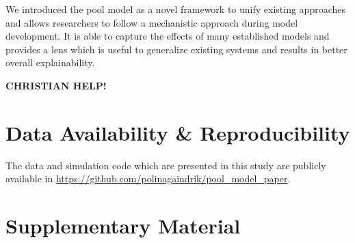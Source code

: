 \documentclass[10pt,A4paper]{article}
\numberwithin{equation}{section}
\newcommand{\beginsupplement}{%
  \renewcommand{\thesection}{}
  \setcounter{subsection}{0}
  \renewcommand{\thesubsection}{S\arabic{subsection}}
  \setcounter{table}{0}
  \renewcommand{\thetable}{S\arabic{table}}%
  \setcounter{figure}{0}
  \renewcommand{\thefigure}{S\arabic{figure}}%
  \setcounter{listing}{0}
  \renewcommand{\thelisting}{S\arabic{listing}}
}
\begin{document}
We introduced the pool model as a novel framework to unify existing approaches and allows researchers to follow a mechanistic approach during model development.
It is able to capture the effects of many established models and provides a lens which is useful to generalize existing systems and results in better overall explainability.

\textbf{CHRISTIAN HELP!}

\onecolumn

\newpage
\section*{Data Availability \& Reproducibility}

The data and simulation code which are presented in this study are publicly available in
\url{https://github.com/polinagaindrik/pool_model_paper}.

\printbibliography

\newpage
\beginsupplement
\section{Supplementary Material}
\end{document}
